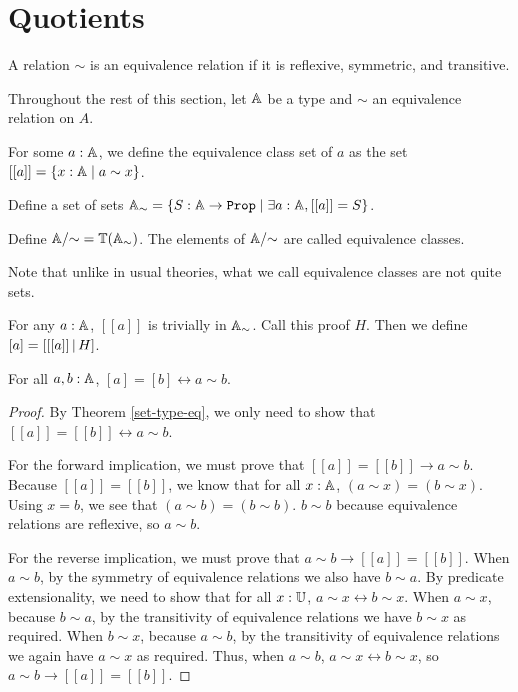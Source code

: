 \documentclass[../math.tex]{subfiles}
\begin{document}
\section{Quotients}

\begin{definition}
    A relation $\sim$ is an equivalence relation if it is reflexive, symmetric,
    and transitive.
\end{definition}

Throughout the rest of this section, let $\mathbb{A}$ be a type and $\sim$ an
equivalence relation on $A$.

\begin{definition}
    For some $a : \mathbb{A}$, we define the equivalence class set of $a$ as the set
    $[[a]] = \{x : \mathbb{A} \mid a \sim x\}$.
\end{definition}

\begin{definition}
    Define a set of sets $\A_\sim = \{S : \A \to \Prop \mid \exists a : \A,
    [[a]] = S\}$.
\end{definition}

\begin{definition}
    Define $\mathbb{A}/{\sim} = \mathbb{T}(\mathbb{A}_\sim)$.  The elements of $\mathbb{A}/{\sim}$ are called
    equivalence classes.
\end{definition}
Note that unlike in usual theories, what we call equivalence classes are not
quite sets.

\begin{definition}
    For any $a : \mathbb{A}$, $[ [a]]$ is trivially in $\mathbb{A}_\sim$.  Call this proof $H$.
    Then we define $[a] = [ [ [a]] \, | \, H ]$.
\end{definition}

\begin{theorem} \label{equiv-eq}
    For all $a, b : \mathbb{A}$, $[a] = [b] \leftrightarrow a \sim b$.
\end{theorem}
\begin{proof}
    By Theorem \ref{set-type-eq}, we only need to show that $[ [a]] = [ [b]]
    \leftrightarrow a \sim b$.

    For the forward implication, we must prove that $[ [a]] = [ [b]] \to a \sim
    b$.  Because $[ [a]] = [ [b]]$, we know that for all $x : \mathbb{A}$, $(a \sim x) =
    (b \sim x)$.  Using $x = b$, we see that $(a \sim b) = (b \sim b)$.  $b \sim
    b$ because equivalence relations are reflexive, so $a \sim b$.

    For the reverse implication, we must prove that $a \sim b \to [ [a]] = [
    [b]]$.  When $a \sim b$, by the symmetry of equivalence relations we also
    have $b \sim a$.  By predicate extensionality, we need to show that for all
    $x : \mathbb{U}$, $a \sim x \leftrightarrow b \sim x$.  When $a \sim x$, because $b
    \sim a$, by the transitivity of equivalence relations we have $b \sim x$ as
    required.  When $b \sim x$, because $a \sim b$, by the transitivity of
    equivalence relations we again have $a \sim x$ as required.  Thus, when $a
    \sim b$, $a \sim x \leftrightarrow b \sim x$, so $a \sim b \to [ [a]] = [
    [b]]$.
\end{proof}
\end{document}
